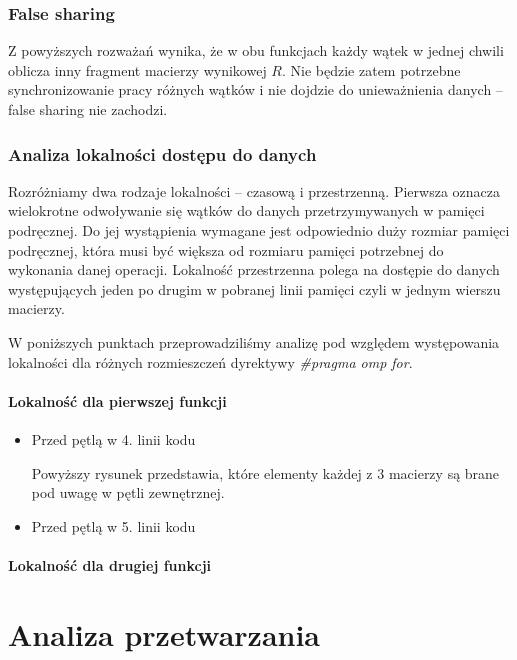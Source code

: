 \documentclass{article}
\begin{document}
\subsubsection{False sharing}

Z powyższych rozważań wynika, że w obu funkcjach każdy wątek w jednej chwili oblicza inny fragment macierzy wynikowej $R$. Nie będzie zatem potrzebne synchronizowanie pracy różnych wątków i nie dojdzie do unieważnienia danych -- false sharing nie zachodzi.

\subsubsection{Analiza lokalności dostępu do danych}

Rozróżniamy dwa rodzaje lokalności -- czasową i przestrzenną. Pierwsza oznacza wielokrotne odwoływanie się wątków do danych przetrzymywanych w pamięci podręcznej. Do jej wystąpienia wymagane jest odpowiednio duży rozmiar pamięci podręcznej, która musi być większa od rozmiaru pamięci potrzebnej do wykonania danej operacji. Lokalność przestrzenna polega na dostępie do danych występujących jeden po drugim w pobranej linii pamięci czyli w jednym wierszu macierzy.

W poniższych punktach przeprowadziliśmy analizę pod względem występowania lokalności dla różnych rozmieszczeń dyrektywy \textit{\#pragma omp for}.

\paragraph{Lokalność dla pierwszej funkcji}

\begin{itemize}
\item Przed pętlą w 4. linii kodu


Powyższy rysunek przedstawia, które elementy każdej z 3 macierzy są brane pod uwagę w pętli zewnętrznej. 

\item Przed pętlą w 5. linii kodu
\end{itemize}

\paragraph{Lokalność dla drugiej funkcji}


\section{Analiza przetwarzania}
\end{document}
